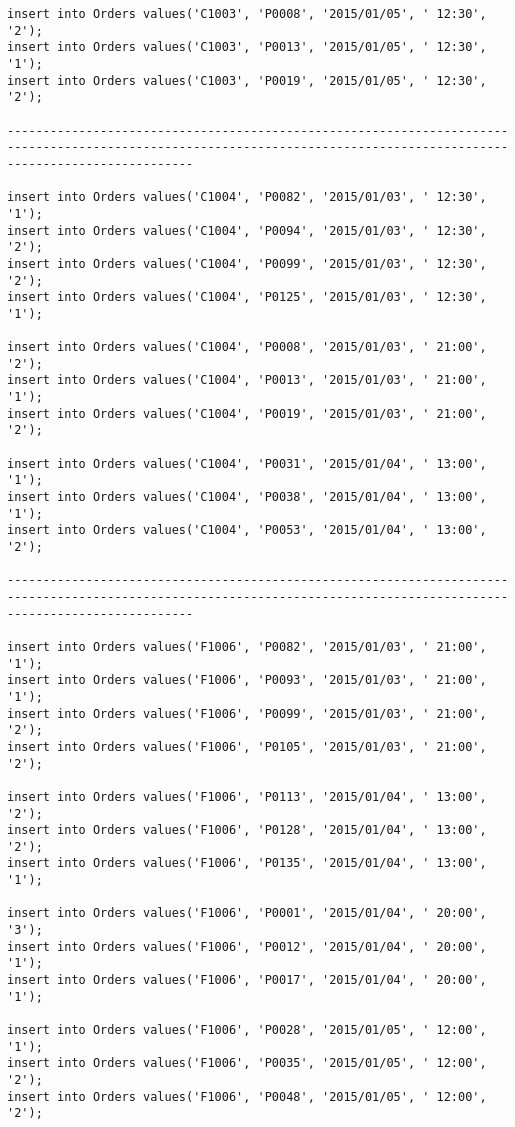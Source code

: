 \documentclass[a4,12pt]{report}
\begin{document}
\begin{lstlisting}
insert into Orders values('C1003', 'P0008', '2015/01/05', ' 12:30', '2');
insert into Orders values('C1003', 'P0013', '2015/01/05', ' 12:30', '1');
insert into Orders values('C1003', 'P0019', '2015/01/05', ' 12:30', '2');

----------------------------------------------------------------------------------------------------------------------------------------------------------------------

insert into Orders values('C1004', 'P0082', '2015/01/03', ' 12:30', '1');
insert into Orders values('C1004', 'P0094', '2015/01/03', ' 12:30', '2');
insert into Orders values('C1004', 'P0099', '2015/01/03', ' 12:30', '2');
insert into Orders values('C1004', 'P0125', '2015/01/03', ' 12:30', '1');

insert into Orders values('C1004', 'P0008', '2015/01/03', ' 21:00', '2');
insert into Orders values('C1004', 'P0013', '2015/01/03', ' 21:00', '1');
insert into Orders values('C1004', 'P0019', '2015/01/03', ' 21:00', '2');

insert into Orders values('C1004', 'P0031', '2015/01/04', ' 13:00', '1');
insert into Orders values('C1004', 'P0038', '2015/01/04', ' 13:00', '1');
insert into Orders values('C1004', 'P0053', '2015/01/04', ' 13:00', '2');

----------------------------------------------------------------------------------------------------------------------------------------------------------------------

insert into Orders values('F1006', 'P0082', '2015/01/03', ' 21:00', '1');
insert into Orders values('F1006', 'P0093', '2015/01/03', ' 21:00', '1');
insert into Orders values('F1006', 'P0099', '2015/01/03', ' 21:00', '2');
insert into Orders values('F1006', 'P0105', '2015/01/03', ' 21:00', '2');

insert into Orders values('F1006', 'P0113', '2015/01/04', ' 13:00', '2');
insert into Orders values('F1006', 'P0128', '2015/01/04', ' 13:00', '2');
insert into Orders values('F1006', 'P0135', '2015/01/04', ' 13:00', '1');

insert into Orders values('F1006', 'P0001', '2015/01/04', ' 20:00', '3');
insert into Orders values('F1006', 'P0012', '2015/01/04', ' 20:00', '1');
insert into Orders values('F1006', 'P0017', '2015/01/04', ' 20:00', '1');

insert into Orders values('F1006', 'P0028', '2015/01/05', ' 12:00', '1');
insert into Orders values('F1006', 'P0035', '2015/01/05', ' 12:00', '2');
insert into Orders values('F1006', 'P0048', '2015/01/05', ' 12:00', '2');


\end{lstlisting}
\end{document}
